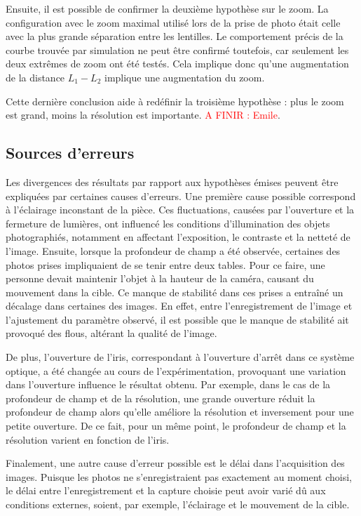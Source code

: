 \documentclass[11pt,letterpaper]{article}
\begin{document}

Ensuite, il est possible de confirmer la deuxième hypothèse sur le zoom. La
configuration avec le zoom maximal utilisé lors de la prise de photo était celle avec
la plus grande séparation entre les lentilles. Le comportement précis de la courbe
trouvée par simulation ne peut être confirmé toutefois, car seulement les deux extrêmes
de zoom ont été testés. Cela implique donc qu'une augmentation de la distance $L_1 - L_2$ implique une augmentation du zoom.

Cette dernière conclusion aide à redéfinir la troisième hypothèse : plus le zoom est
grand, moins la résolution est importante. \textcolor{red}{A FINIR : Emile}.

\subsection{Sources d'erreurs}
Les divergences des résultats par rapport aux hypothèses émises peuvent être expliquées par certaines causes d'erreurs. Une première cause possible correspond à l'éclairage inconstant de la pièce. Ces fluctuations, causées par l'ouverture et la fermeture de lumières, ont influencé les conditions d'illumination des objets photographiés, notamment en affectant l'exposition, le contraste et la netteté de l'image. Ensuite, lorsque la profondeur de champ a été observée, certaines des photos prises impliquaient de se tenir entre deux tables. Pour ce faire, une personne devait maintenir l'objet à la hauteur de la caméra, causant du mouvement dans la cible. Ce manque de stabilité dans ces prises a entraîné un décalage dans certaines des images. En effet, entre l'enregistrement de l'image et l'ajustement du paramètre observé, il est possible que le manque de stabilité ait provoqué des flous, altérant la qualité de l'image. 

De plus, l'ouverture de l'iris, correspondant à l'ouverture d'arrêt dans ce système optique, a été changée au cours de l'expérimentation, provoquant une variation dans l'ouverture influence le résultat obtenu. Par exemple, dans le cas de la profondeur de champ et de la résolution, une grande ouverture réduit la profondeur de champ alors qu'elle améliore la résolution et inversement pour une petite ouverture. De ce fait, pour un même point, le profondeur de champ et la résolution varient en fonction de l'iris.

Finalement, une autre cause d'erreur possible est le délai dans l'acquisition des images. Puisque les photos ne s'enregistraient pas exactement au moment choisi, le délai entre l'enregistrement et la capture choisie peut avoir varié dû aux conditions externes, soient, par exemple, l'éclairage et le mouvement de la cible.
\end{document}
